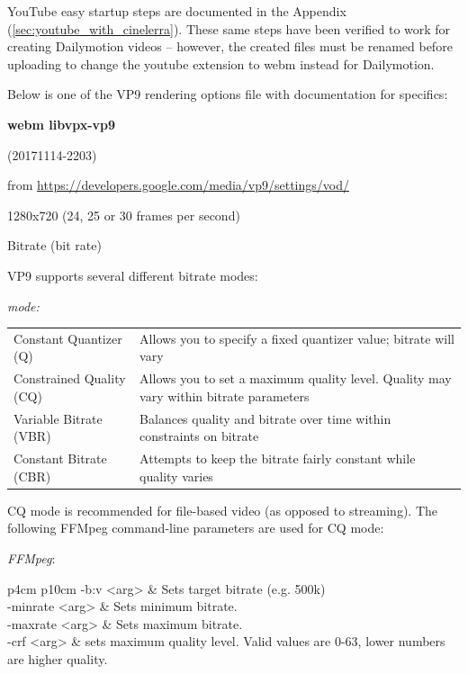 YouTube easy startup steps are documented in the Appendix (\ref{sec:youtube_with_cinelerra}). These same steps have been verified to work for creating Dailymotion videos -- however, the created files must be renamed before uploading to change the youtube extension to webm instead for Dailymotion.

Below is one of the \textsc{VP9} rendering options file with documentation for specifics:

\textbf{webm libvpx-vp9}

(20171114-2203)

from {\small \url{https://developers.google.com/media/vp9/settings/vod/}}

1280x720 (24, 25 or 30 frames per second)

Bitrate (bit rate)

\textsc{VP9} supports several different bitrate modes:

\textit{mode:}

\begin{tabular}{p{6cm} p{10cm}}
	Constant Quantizer (Q) & Allows you to specify a fixed quantizer value; bitrate will vary \\
	Constrained Quality (CQ) & Allows you to set a maximum quality level. Quality may vary within bitrate parameters\\
	Variable Bitrate (VBR) & Balances quality and bitrate over time within constraints on bitrate\\
	Constant Bitrate (CBR) & Attempts to keep the bitrate fairly constant while quality varies\\
\end{tabular}

CQ mode is recommended for file-based video (as opposed to streaming). The following FFMpeg command-line parameters are used for CQ mode:

\textit{FFMpeg}:

\begin{center}
	\begin{tabular}{{p{4cm} p{10cm}}}
	-b:v <arg> & Sets target bitrate (e.g. 500k)\\
	-minrate <arg> & Sets minimum bitrate.\\
	-maxrate <arg> & Sets maximum bitrate.\\
	-crf <arg> & sets maximum quality level. Valid values are 0-63, lower numbers are higher quality.\\
\end{tabular}
\end{center}

